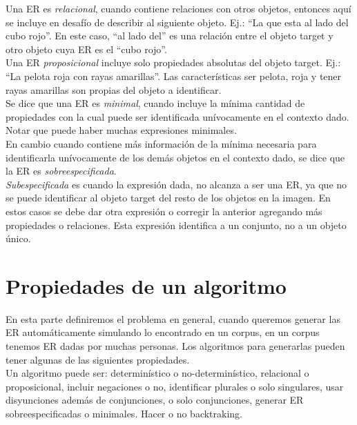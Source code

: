 Una ER es {\it relacional}, cuando contiene relaciones con otros objetos, entonces aqu\'{i} se incluye en desaf\'{i}o de describir al siguiente objeto. Ej.: ``La que esta al lado del cubo rojo''. En este caso, ``al lado del'' es una relaci\'on entre el objeto target y otro objeto cuya ER es el ``cubo rojo''.\\

Una ER {\it proposicional} incluye solo propiedades absolutas del objeto target. Ej.: ``La pelota roja con rayas amarillas''. Las caracter\'isticas ser pelota, roja y tener rayas amarillas son propias del objeto a identificar.\\

Se dice que una ER es {\it minimal}, cuando incluye la m\'inima cantidad de propiedades con la cual puede ser identificada un\'ivocamente en el contexto dado. Notar que puede haber muchas expresiones minimales.\\

En cambio cuando contiene m\'as informaci\'on de la m\'inima necesaria para identificarla un\'ivocamente de los dem\'as objetos en el contexto dado, se dice que la ER es {\it sobreespecificada}.\\

{\it Subespecificada} es cuando la expresi\'on dada, no alcanza a ser una ER, ya que no se puede identificar al objeto target del resto de los objetos en la imagen. En estos casos se debe dar otra expresi\'on o corregir la anterior agregando m\'as propiedades o relaciones. Esta expresi\'on identifica a un conjunto, no a un objeto \'unico.


\section{Propiedades de un algoritmo}

En esta parte definiremos el problema en general, cuando queremos generar las ER autom\'aticamente simulando lo encontrado en un corpus, en un corpus tenemos ER dadas por muchas personas. Los algoritmos para generarlas pueden tener algunas de las siguientes propiedades.\\

Un algoritmo puede ser: determin\'{i}stico o no-determin\'{i}stico, relacional o proposicional, incluir negaciones o no, identificar plurales o solo singulares, usar disyunciones adem\'as de conjunciones, o solo conjunciones, generar ER sobreespecificadas o minimales. Hacer o no backtraking.\\

